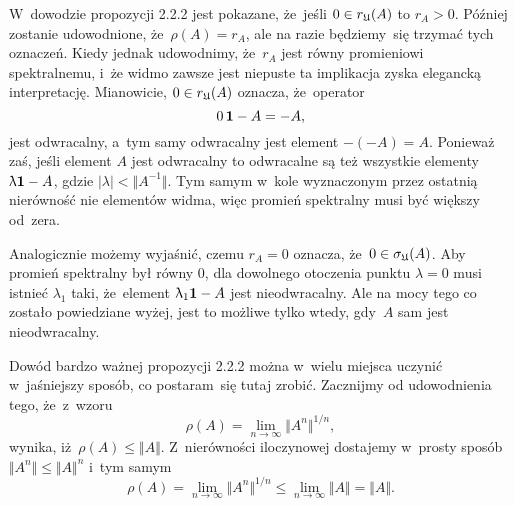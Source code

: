 \documentclass[a4paper,11pt]{article}
\begin{document}
\noindent
{} W~dowodzie propozycji 2.2.2 jest pokazane, że~jeśli
$0 \in r_{ \mathfrak{U} }( A )$ to $r_{ A } > 0$. Później zostanie udowodnione,
że~$\rho( A ) = r_{ A }$, ale na razie będziemy~się trzymać tych oznaczeń.
Kiedy jednak udowodnimy, że~$r_{ A }$ jest równy promieniowi spektralnemu,
i~że widmo zawsze jest niepuste ta implikacja zyska elegancką interpretację.
Mianowicie, $0 \in r_{ \mathfrak{U} }( A )$ oznacza, że~operator
\begin{equation}
  \label{eq:Bratteli-Robinson-Operator-Algebras-ETC-Vol-I-s01-36}
  0 \, \mathbf{1} - A = -A,
\end{equation}
jest odwracalny, a~tym samy odwracalny jest element $-( -A ) = A$. Ponieważ
zaś, jeśli element $A$ jest odwracalny to odwracalne są też wszystkie
elementy $\uplambda \mathbf{1} - A$, gdzie $| \lambda | < \Vert A^{ -1 } \Vert$. Tym samym w~kole
wyznaczonym przez ostatnią nierówność nie elementów widma, więc promień
spektralny musi być większy od~zera.

Analogicznie możemy wyjaśnić, czemu $r_{ A } = 0$ oznacza,
że~$0 \in \sigma_{ \mathfrak{U} }( A )$. Aby promień spektralny był równy $0$, dla
dowolnego otoczenia punktu $\lambda = 0$ musi istnieć $\lambda_{ 1 }$ taki,
że~element $\uplambda_{ 1 } \mathbf{1} - A$ jest nieodwracalny. Ale na mocy tego co
zostało powiedziane wyżej, jest to możliwe tylko wtedy, gdy~$A$ sam jest
nieodwracalny.

\vspace{\VerSpaceFour}





\noindent
{} Dowód bardzo ważnej propozycji 2.2.2 można w~wielu miejsca
uczynić w~jaśniejszy sposób, co postaram~się tutaj zrobić. Zacznijmy od
udowodnienia tego, że~z~wzoru
\begin{equation}
  \label{eq:Bratteli-Robinson-Operator-Algebras-ETC-Vol-I-s01-37}
  \rho( A ) = \lim_{ n \to \infty } \Vert A^{ n } \Vert^{ 1 / n },
\end{equation}
wynika, iż~$\rho( A ) \leq \Vert A \Vert$. Z~nierówności iloczynowej dostajemy w~prosty
sposób $\Vert A^{ n } \Vert \leq \Vert A \Vert^{ n }$ i~tym samym
\begin{equation}
  \label{eq:Bratteli-Robinson-Operator-Algebras-ETC-Vol-I-s01-38}
  \rho( A ) =
  \lim_{ n \to \infty } \Vert A^{ n } \Vert^{ 1 / n } \leq
  \lim_{ n \to \infty } \Vert A \Vert = \Vert A \Vert.
\end{equation}
\end{document}
